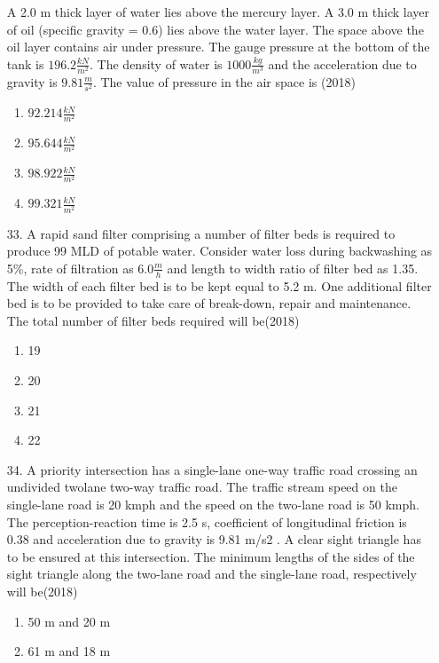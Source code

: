 \documentclass[journal]{IEEEtran}
\begin{document}
\begin{enumerate}
    A 2.0 m thick layer of water lies above the mercury layer. A 3.0 m thick layer of oil
    (specific gravity = 0.6) lies above the water layer. The space above the oil layer contains
    air under pressure. The gauge pressure at the bottom of the tank is $196.2 \frac{kN}{m^2}$. The density of water is $1000 \frac{kg}{m^3}$
    and the acceleration due to gravity is $9.81 \frac{m}{s^2}$. The value
    of pressure in the air space is \hfill (2018)
    \begin{enumerate}[label=(\Alph*)]
        \item $92.214 \frac{kN}{m^2}$
        \item $95.644 \frac{kN}{m^2}$
        \item $98.922 \frac{kN}{m^2}$
        \item $99.321 \frac{kN}{m^2}$
    \end{enumerate} 
    \item[33.] A rapid sand filter comprising a number of filter beds is required to produce 99 MLD of
    potable water. Consider water loss during backwashing as 5\%, rate of filtration as $6.0 \frac{m}{h}$
    and length to width ratio of filter bed as 1.35. The width of each filter bed is to be kept
    equal to 5.2 m. One additional filter bed is to be provided to take care of break-down,
    repair and maintenance. The total number of filter beds required will be\hfill (2018)
    \begin{enumerate}[label=(\Alph*)]
        \item 19
        \item 20
        \item 21
        \item 22
    \end{enumerate}
    \item[34.] A priority intersection has a single-lane one-way traffic road crossing an undivided twolane two-way traffic road. The traffic stream speed on the single-lane road is 20 kmph and
    the speed on the two-lane road is 50 kmph. The perception-reaction time is 2.5 s, coefficient of longitudinal friction is 0.38 and acceleration due to gravity is 9.81 m/s2
    . A clear sight triangle has to be ensured at this intersection. The minimum lengths of the sides
    of the sight triangle along the two-lane road and the single-lane road, respectively will be\hfill (2018)
    \begin{enumerate}[label=(\Alph*)]
        \item 50 m and 20 m 
        \item 61 m and 18 m 

\end{enumerate}
\end{enumerate}
\end{document}
